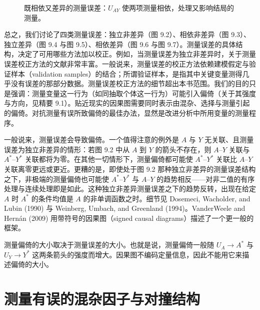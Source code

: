 \begin{figure}[htbp]
\centering
{}
\caption{既相依又差异的测量误差：$U_{AY}$ 使两项测量相依，处理又影响结局的测量。}
\label{fig:9.7}
\end{figure}

总之，我们讨论了四类测量误差：独立非差异（图 9.2）、相依非差异（图 9.3）、独立差异（图 9.4 与图 9.5）、相依差异（图 9.6 与图 9.7）。测量误差的具体结构，决定了可用哪些方法加以校正。例如，当测量误差为独立非差异时，关于测量误差校正方法的文献非常丰富。一般说来，测量误差的校正方法依赖建模假定与验证样本（validation samples）的结合；所谓验证样本，是指其中关键变量测得几乎没有误差的那部分数据。测量误差校正方法的细节超出本书范围。我们的目的只是强调：测量变量这一行为（如同抽取个体这一行为）可能引入偏倚（关于其强度与方向，见精要 9.1）。贴近现实的因果图需要同时表示由混杂、选择与测量引起的偏倚。对抗测量有误所致偏倚的最佳办法，显然是改进分析中所用变量的测量程序。

\renewcommand{\FPname}{精要（Fine Point）}
\begin{finepoint}[测量偏倚的强度与方向]
一般说来，测量误差会导致偏倚。一个值得注意的例外是 $A$ 与 $Y$ 无关联、且测量误差为独立非差异的情形：若图 9.2 中从 $A$ 到 $Y$ 的箭头不存在，则 $A$–$Y$ 关联与 $A^{*}$–$Y^{*}$ 关联都将为零。在其他一切情形下，测量偏倚都可能使 $A^{*}$–$Y^{*}$ 关联比 $A$–$Y$ 关联离零更远或更近。更糟的是，即使处于图 9.2 那种独立非差异的测量误差结构之下，非极端的测量偏倚也可能使 $A^{*}$–$Y^{*}$ 与 $A$–$Y$ 的趋势相反——对非二值的有序处理与连续处理即是如此。这种独立非差异测量误差之下的趋势反转，出现在给定 $A$ 时 $A^{*}$ 的条件均值是 $A$ 的非单调函数之时。细节见 Dosemeci, Wacholder, and Lubin (1990) 与 Weinberg, Umbach, and Greenland (1994)。VanderWeele and Hernán (2009) 用带符号的因果图（signed causal diagrams）描述了一个更一般的框架。

测量偏倚的大小取决于测量误差的大小。也就是说，测量偏倚一般随 $U_A\to A^{*}$ 与 $U_Y\to Y^{*}$ 这两条箭头的强度而增大。因果图不编码定量信息，因此不能用它来描述偏倚的大小。
\end{finepoint}
\renewcommand{\FPname}{精要}

\section{测量有误的混杂因子与对撞结构}

